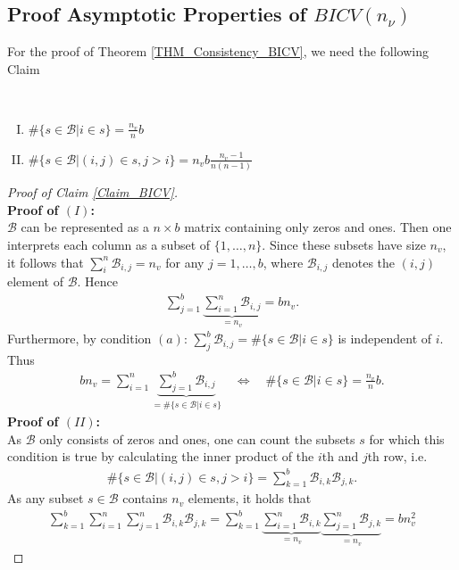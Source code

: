 \documentclass[Research_Module_ES.tex]{subfiles}
\begin{document}
\subsection*{Proof Asymptotic Properties of $BICV(n_\nu)$}
For the proof of Theorem \ref{THM_Consistency_BICV}, we need the following Claim
\begin{claim}~
	\label{Claim_BICV}
	\begin{enumerate}[(I)]
		\item $\#\{s\in \mathcal{B}| i\in s\} = \frac{n_v}{n} b$ 
		\item $\#\{s\in\mathcal{B}|(i,j)\in s, j>i\}=n_vb\frac{n_v-1}{n(n-1)}$
	\end{enumerate}
\end{claim}
\begin{proof}[Proof of Claim \ref{Claim_BICV}]~\\
	\textbf{Proof of $(I)$:}\\
	$\mathcal{B}$ can be represented as a $n\times b$ matrix containing only zeros and ones. Then one interprets each column as a subset of $\{ 1,\dots,n\}$. Since these subsets have size $n_v$, it follows that $\sum_i^n \mathcal{B}_{i,j}=n_v$ for any $j= 1, \dots ,b$, where $\mathcal{B}_{i,j}$ denotes the $(i,j)$ element of $\mathcal{B}$. Hence
	\begin{align*}
	\sum_{j=1}^b\underbrace{\sum_{i=1}^n \mathcal{B}_{i,j}}_{=n_v} = bn_v.
	\end{align*}
	Furthermore, by condition $(a)$: $\sum_j^b \mathcal{B}_{i,j} = \#\{s\in \mathcal{B}| i\in s\}$ is independent of $i$. Thus 
	\begin{align*}
	bn_v = \sum_{i=1}^n\underbrace{\sum_{j=1}^b \mathcal{B}_{i,j}}_{=\#\{s\in \mathcal{B}| i\in s\}} \quad
	\iff \quad \#\{s\in \mathcal{B}| i\in s\} = \frac{n_v}{n}b. 
	\end{align*} 
	\textbf{Proof of $(II)$:}\\
	As $\mathcal{B}$ only consists of zeros and ones, one can count the subsets $s$ for which this condition is true by calculating the inner product of the $i$th and $j$th row, i.e.
	\begin{align*}
	\#\{s\in\mathcal{B}|(i,j)\in s, j>i\} = \sum_{k=1}^b\mathcal{B}_{i,k}\mathcal{B}_{j,k}.
	\end{align*}
	As any subset $s \in \mathcal{B}$ contains $n_v$ elements, it holds that
	\begin{align*}
	\sum_{k=1}^b\sum_{i=1}^n\sum_{j=1}^n\mathcal{B}_{i,k}\mathcal{B}_{j,k}= \sum_{k=1}^b\underbrace{\sum_{i=1}^n\mathcal{B}_{i,k}}_{=n_v}\underbrace{\sum_{j=1}^n\mathcal{B}_{j,k}}_{=n_v}=bn_v^2

\end{align*}
\end{proof}
\end{document}
